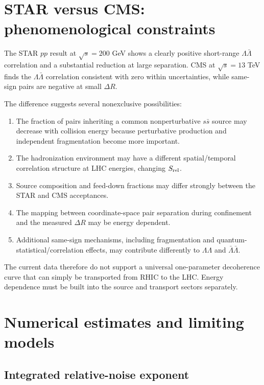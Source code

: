 \documentclass[11pt]{article}
\begin{document}
\section{STAR versus CMS: phenomenological constraints}

The STAR $pp$ result at $\sqrt{s}=200$ GeV shows a clearly positive short-range $\Lambda\bar\Lambda$ correlation and a substantial reduction at large separation. CMS at $\sqrt{s}=13$ TeV finds the $\Lambda\bar\Lambda$ correlation consistent with zero within uncertainties, while same-sign pairs are negative at small $\Delta R$.

The difference suggests several nonexclusive possibilities:

\begin{enumerate}[leftmargin=1.6em]
\item The fraction of pairs inheriting a common nonperturbative $s\bar s$ source may decrease with collision energy because perturbative production and independent fragmentation become more important.
\item The hadronization environment may have a different spatial/temporal correlation structure at LHC energies, changing $S_{\rm rel}$.
\item Source composition and feed-down fractions may differ strongly between the STAR and CMS acceptances.
\item The mapping between coordinate-space pair separation during confinement and the measured $\Delta R$ may be energy dependent.
\item Additional same-sign mechanisms, including fragmentation and quantum-statistical/correlation effects, may contribute differently to $\Lambda\Lambda$ and $\bar\Lambda\bar\Lambda$.
\end{enumerate}

The current data therefore do not support a universal one-parameter decoherence curve that can simply be transported from RHIC to the LHC. Energy dependence must be built into the source and transport sectors separately.

\section{Numerical estimates and limiting models}

\subsection{Integrated relative-noise exponent}
\end{document}
